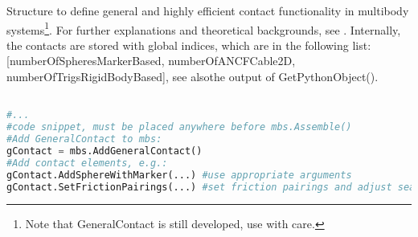 \label{sec:GeneralContact}



Structure to define general and highly efficient contact functionality in multibody systems\footnote{Note that GeneralContact is still developed, use with care.}. For further explanations and theoretical backgrounds, see . Internally, the contacts are stored with global indices, which are in the following list: [numberOfSpheresMarkerBased, numberOfANCFCable2D, numberOfTrigsRigidBodyBased], see alsothe output of GetPythonObject().
\pythonstyle
\begin{lstlisting}[language=Python, firstnumber=1]

#...
#code snippet, must be placed anywhere before mbs.Assemble()
#Add GeneralContact to mbs:
gContact = mbs.AddGeneralContact()
#Add contact elements, e.g.:
gContact.AddSphereWithMarker(...) #use appropriate arguments
gContact.SetFrictionPairings(...) #set friction pairings and adjust searchTree if needed.
\end{lstlisting}

